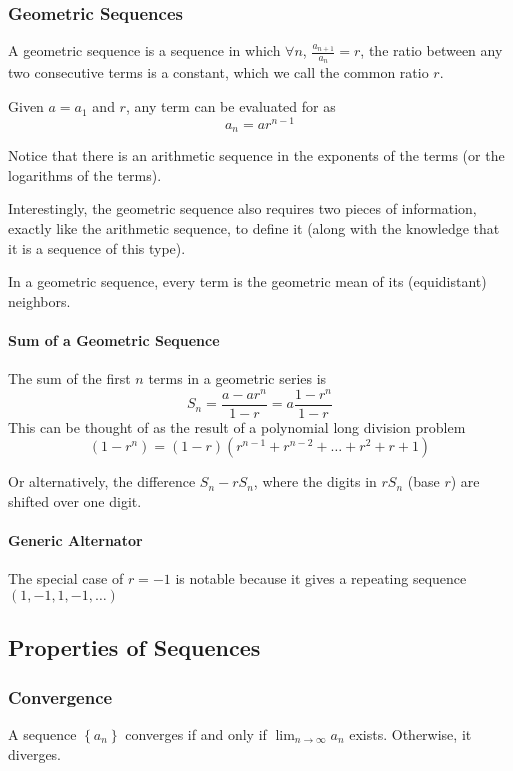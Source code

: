 \documentclass{article}
\begin{document}
\subsubsection{Geometric Sequences}
A geometric sequence is a sequence in which $\forall n$, $\frac{a_{n+1}}{a_n} = r$, the ratio between any two consecutive terms is a constant, which we call the common ratio $r$.

Given $a = a_1$ and $r$, any term can be evaluated for as
$$a_n = ar^{n-1}$$

Notice that there is an arithmetic sequence in the exponents of the terms (or the logarithms of the terms).

Interestingly, the geometric sequence also requires two pieces of information, exactly like the arithmetic sequence, to define it (along with the knowledge that it is a sequence of this type).

In a geometric sequence, every term is the geometric mean of its (equidistant) neighbors.

\paragraph{Sum of a Geometric Sequence}
The sum of the first $n$ terms in a geometric series is
$$S_n = \frac{a-ar^n}{1-r}=a\frac{1-r^n}{1-r}$$
This can be thought of as the result of a polynomial long division problem $$\left(1-r^n\right) = \left(1-r\right)\left(r^{n-1} + r^{n-2} + \ldots + r^2 + r + 1\right)$$

Or alternatively, the difference $S_n - rS_n$, where the digits in $rS_n$ (base $r$) are shifted over one digit.

\paragraph{Generic Alternator}
The special case of $r = -1$ is notable because it gives a repeating sequence $\left(1, -1, 1, -1, \ldots\right)$

\subsection{Properties of Sequences}
\subsubsection{Convergence}
A sequence $\left\{ a_n \right\}$ converges if and only if $\lim_{n\to \infty} a_n$ exists. Otherwise, it diverges.
\end{document}
